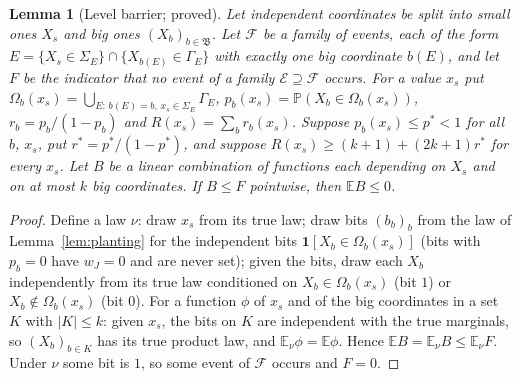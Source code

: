 \documentclass[11pt,reqno]{amsart}
\newtheorem{lemma}[theorem]{Lemma}
\theoremstyle{definition}
\newcommand{\E}{\mathbb E}
\newcommand{\PP}{\mathbb P}
\begin{document}
\begin{lemma}[Level barrier; proved]\label{lem:barrier}
Let independent coordinates be split into small ones $X_s$ and big ones
$(X_b)_{b\in\mathfrak B}$.  Let $\mathcal F$ be a family of events, each of the
form $E=\{X_s\in\Sigma_E\}\cap\{X_{b(E)}\in\Gamma_E\}$ with exactly one big
coordinate $b(E)$, and let $F$ be the indicator that no event of a family
$\mathcal E\supseteq\mathcal F$ occurs.  For a value $x_s$ put
$\Omega_b(x_s)=\bigcup_{E:\,b(E)=b,\,x_s\in\Sigma_E}\Gamma_E$,
$p_b(x_s)=\PP(X_b\in\Omega_b(x_s))$, $r_b=p_b/(1-p_b)$ and $R(x_s)=\sum_br_b(x_s)$.
Suppose $p_b(x_s)\le p^*<1$ for all $b$, $x_s$, put $r^*=p^*/(1-p^*)$, and
suppose $R(x_s)\ge(k+1)+(2k+1)r^*$ for \emph{every} $x_s$.  Let $B$ be a linear
combination of functions each depending on $X_s$ and on at most $k$ big
coordinates.  If $B\le F$ pointwise, then $\E B\le0$.
\end{lemma}

\begin{proof}
Define a law $\nu$: draw $x_s$ from its true law; draw bits $(b_b)_b$ from the
law of Lemma~\ref{lem:planting} for the independent bits
$\mathbf 1[X_b\in\Omega_b(x_s)]$ (bits with $p_b=0$ have $w_J=0$ and are never
set); given the bits, draw each $X_b$ independently from its true law
conditioned on $X_b\in\Omega_b(x_s)$ (bit $1$) or $X_b\notin\Omega_b(x_s)$ (bit $0$).
For a function $\phi$ of $x_s$ and of the big coordinates in a set $K$ with
$|K|\le k$: given $x_s$, the bits on $K$ are independent with the true
marginals, so $(X_b)_{b\in K}$ has its true product law, and
$\E_\nu\phi=\E\phi$.  Hence $\E B=\E_\nu B\le\E_\nu F$.  Under $\nu$ some bit is
$1$, so some event of $\mathcal F$ occurs and $F=0$.
\end{proof}
\end{document}
